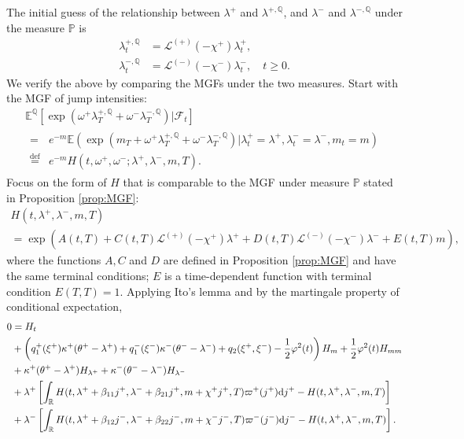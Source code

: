 \documentclass[11pt,a4paper]{article}
\numberwithin{equation}{section}
\theoremstyle{remark}
\theoremstyle{definition}
\newcommand{\E}{{\mathbb{E}}}
\newcommand{\dd}{{\rm d}}
\begin{document}
The initial guess of the relationship between $\lambda^+$ and $\lambda^{+, \mathbb{Q}}$, and $\lambda^-$ and $\lambda^{-, \mathbb{Q}}$ under the measure $\mathbb{P}$ is
\begin{align*}
     \lambda^{+, \mathbb{Q}}_t &= \mathcal{L}^{(+)}(-\chi^+)\lambda^+_t, \\
     \lambda^{-, \mathbb{Q}}_t &= \mathcal{L}^{(-)}(-\chi^-)\lambda^-_t, \quad t\geq 0.
\end{align*}
We verify the above by comparing the MGFs under the two measures.
Start with the MGF of jump intensities:
\begin{multline*}
    \E^\mathbb{Q}\left[\exp(\omega^+\lambda^{+, \mathbb{Q}}_T + \omega^-\lambda^{-, \mathbb{Q}}_T)\big| \mathcal{F}_t\right]\\
    \begin{aligned}
    = &e^{-m}\E\left(\exp(m_T+\omega^+\lambda^{+, \mathbb{Q}}_T+\omega^-\lambda^{-, \mathbb{Q}}_T)\big| \lambda^+_t=\lambda^+, \lambda^-_t=\lambda^-, m_t=m\right)\\
    \overset{\text{def}}= &e^{-m}H(t, \omega^+, \omega^-; \lambda^+, \lambda^-, m, T).
  \end{aligned}
\end{multline*}
Focus on the form of $H$ that is comparable to the MGF under measure $\mathbb{P}$ stated in Proposition  \ref{prop:MGF}:
\begin{multline*}
  H(t, \lambda^+, \lambda^-, m, T) \\
  = \exp\left(A(t,T) + C(t,T)\mathcal{L}^{(+)}(-\chi^+)\lambda^+ + D(t,T)\mathcal{L}^{(-)}(-\chi^-)\lambda^- + E(t,T)m\right),
\end{multline*}
where the functions $A, C$ and $D$ are defined in Proposition \ref{prop:MGF} and have the same terminal conditions; $E$ is a time-dependent function with terminal condition $E(T,T)=1$.
Applying Ito's lemma and by the martingale property of conditional expectation,
\begin{align*}
    0 &= H_t \\
    &+\left(q^+_1(\xi^+)\kappa^+(\theta^+-\lambda^+)+q^-_1(\xi^-)\kappa^-(\theta^--\lambda^-)+q_2(\xi^+,\xi^-)-\frac{1}{2}\varphi^2(t)\right)H_m
    +\frac{1}{2}\varphi^2(t)H_{mm}\\
    &+\kappa^+(\theta^+-\lambda^+) H_{\lambda^+}
    +\kappa^-(\theta^--\lambda^-) H_{\lambda^-}\\
    &+\lambda^+ \left[\int_\mathbb{R}H(t, \lambda^++\beta_{11}j^+, \lambda^-+\beta_{21}j^+, m+\chi^+j^+, T)\varpi^+(j^+)\dd j^+-H(t,  \lambda^+, \lambda^-, m, T)\right]\\
    &+\lambda^- \left[\int_\mathbb{R}H(t, \lambda^++\beta_{12}j^-, \lambda^-+\beta_{22}j^-, m+\chi^-j^-, T)\varpi^-(j^-)\dd j^--H(t, \lambda^+, \lambda^-, m, T)\right].
\end{align*}
\end{document}
